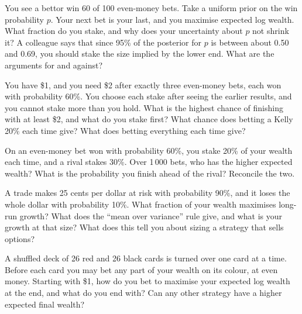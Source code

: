 \begin{question}\label{iq:iv2:betting-and-kelly:28}
You see a bettor win 60 of 100 even-money bets. Take a uniform prior on the win probability $p$. Your next bet is your last, and you maximise expected log wealth. What fraction do you stake, and why does your uncertainty about $p$ not shrink it? A colleague says that since 95\% of the posterior for $p$ is between about 0.50 and 0.69, you should stake the size implied by the lower end. What are the arguments for and against?
\end{question}

\begin{question}\label{iq:iv2:betting-and-kelly:29}
You have \$1, and you need \$2 after exactly three even-money bets, each won with probability 60\%. You choose each stake after seeing the earlier results, and you cannot stake more than you hold. What is the highest chance of finishing with at least \$2, and what do you stake first? What chance does betting a Kelly 20\% each time give? What does betting everything each time give?
\end{question}

\begin{question}\label{iq:iv2:betting-and-kelly:30}
On an even-money bet won with probability 60\%, you stake 20\% of your wealth each time, and a rival stakes 30\%. Over 1\,000 bets, who has the higher expected wealth? What is the probability you finish ahead of the rival? Reconcile the two.
\end{question}

\begin{question}\label{iq:iv2:betting-and-kelly:31}
A trade makes 25 cents per dollar at risk with probability 90\%, and it loses the whole dollar with probability 10\%. What fraction of your wealth maximises long-run growth? What does the ``mean over variance'' rule give, and what is your growth at that size? What does this tell you about sizing a strategy that sells options?
\end{question}

\begin{question}\label{iq:iv2:betting-and-kelly:32}
A shuffled deck of 26 red and 26 black cards is turned over one card at a time. Before each card you may bet any part of your wealth on its colour, at even money. Starting with \$1, how do you bet to maximise your expected log wealth at the end, and what do you end with? Can any other strategy have a higher expected final wealth?
\end{question}

